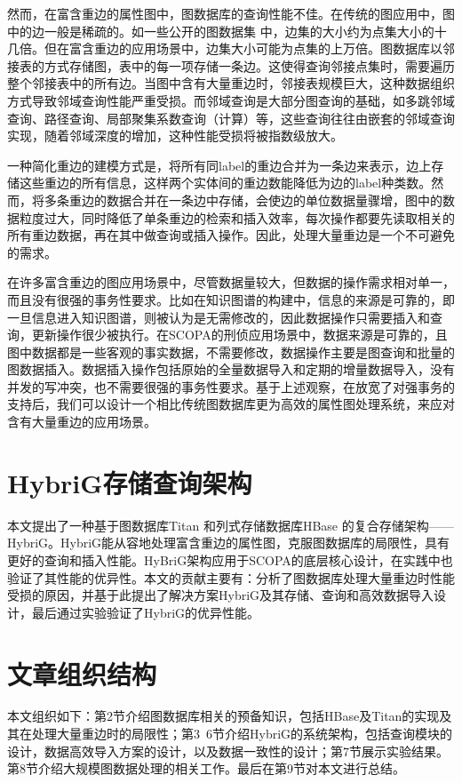 然而，在富含重边的属性图中，图数据库的查询性能不佳。在传统的图应用中，图中的边一般是稀疏的。如一些公开的图数据集 中，边集的大小约为点集大小的十几倍。但在富含重边的应用场景中，边集大小可能为点集的上万倍。图数据库以邻接表的方式存储图，表中的每一项存储一条边。这使得查询邻接点集时，需要遍历整个邻接表中的所有边。当图中含有大量重边时，邻接表规模巨大，这种数据组织方式导致邻域查询性能严重受损。而邻域查询是大部分图查询的基础，如多跳邻域查询、路径查询、局部聚集系数查询（计算）等，这些查询往往由嵌套的邻域查询实现，随着邻域深度的增加，这种性能受损将被指数级放大。

一种简化重边的建模方式是，将所有同label的重边合并为一条边来表示，边上存储这些重边的所有信息，这样两个实体间的重边数能降低为边的label种类数。然而，将多条重边的数据合并在一条边中存储，会使边的单位数据量骤增，图中的数据粒度过大，同时降低了单条重边的检索和插入效率，每次操作都要先读取相关的所有重边数据，再在其中做查询或插入操作。因此，处理大量重边是一个不可避免的需求。

在许多富含重边的图应用场景中，尽管数据量较大，但数据的操作需求相对单一，而且没有很强的事务性要求。比如在知识图谱的构建中\supercite{knowledge_graph}，信息的来源是可靠的，即一旦信息进入知识图谱，则被认为是无需修改的，因此数据操作只需要插入和查询，更新操作很少被执行。在SCOPA的刑侦应用场景中，数据来源是可靠的，且图中数据都是一些客观的事实数据，不需要修改，数据操作主要是图查询和批量的图数据插入。数据插入操作包括原始的全量数据导入和定期的增量数据导入，没有并发的写冲突，也不需要很强的事务性要求。基于上述观察，在放宽了对强事务的支持后，我们可以设计一个相比传统图数据库更为高效的属性图处理系统，来应对含有大量重边的应用场景。

\section{HybriG存储查询架构}
本文提出了一种基于图数据库Titan 和列式存储数据库HBase 的复合存储架构——HybriG。HybriG能从容地处理富含重边的属性图，克服图数据库的局限性，具有更好的查询和插入性能。HyBriG架构应用于SCOPA的底层核心设计，在实践中也验证了其性能的优异性。本文的贡献主要有：分析了图数据库处理大量重边时性能受损的原因，并基于此提出了解决方案HybriG及其存储、查询和高效数据导入设计，最后通过实验验证了HybriG的优异性能。

\section{文章组织结构}
本文组织如下：第2节介绍图数据库相关的预备知识，包括HBase及Titan的实现及其在处理大量重边时的局限性；第3~6节介绍HybriG的系统架构，包括查询模块的设计，数据高效导入方案的设计，以及数据一致性的设计；第7节展示实验结果。第8节介绍大规模图数据处理的相关工作。最后在第9节对本文进行总结。

